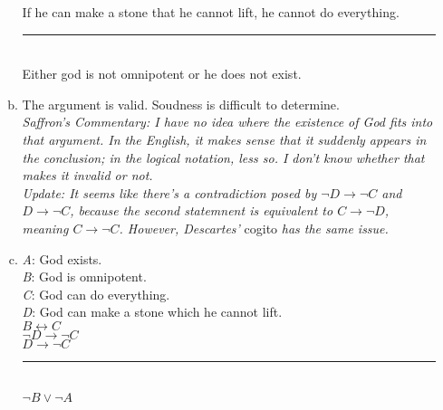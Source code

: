 \documentclass{article}
\begin{document}
\begin{enumerate}
\begin{enumerate}[(a)]
                        If he can make a stone that he cannot lift, he cannot do everything.\\
                        \rule{15em}{.5pt}\\
                        Either god is not omnipotent or he does not exist.
                  \item The argument is valid. Soudness is difficult to determine.\\
                        \textit{Saffron's Commentary: I have no idea where the existence of God fits into that argument. In the English, it makes sense that it suddenly appears in the conclusion; in the logical notation, less so. I don't know whether that makes it invalid or not.\\
                              Update: It seems like there's a contradiction posed by $\neg D \to \neg C$ and $D \to \neg C$, because the second statemnent is equivalent to $C \to \neg D$, meaning $C \to \neg C$. However, Descartes'} cogito \textit{has the same issue.}
                  \item \textit{A}: God exists.\\
                        \textit{B}: God is omnipotent.\\
                        \textit{C}: God can do everything.\\
                        \textit{D}: God can make a stone which he cannot lift.\\

                        $B \leftrightarrow C$\\
                        $\neg D \to \neg C$\\
                        $D \to \neg C$\\
                        \rule{5em}{.5pt}\\
                        $\neg B \lor \neg A$
            \end{enumerate}
\end{enumerate}
\end{document}
